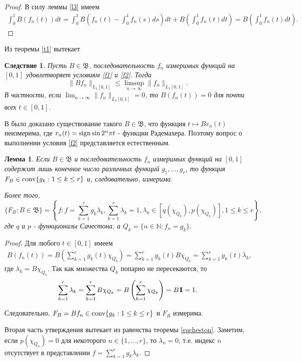 \documentclass[12pt]{article}
\newcommand{\emm}{\mathrm{1\hspace{-0.3em} I}}
\newtheorem{lem}[thm]{Лемма}
\newtheorem{cor}[thm]{Следствие}
\def\N{{\mathbb{N}}}
\def\B{{\mathfrak{B}}}
\begin{document}
\begin{proof}
В силу леммы \ref{l3} имеем
\begin{align*}
\int_0^1 B(f_n(t)) dt = \int_0^1 B\left(f_n(t)-\int_0^1 f_n(s) ds\right) dt +B\left(\int_0^1 f_n(t) dt\right)= B\left(\int_0^1 f_n(t) dt\right).
\end{align*}
\end{proof}

Из теоремы \ref{t1} вытекает

\begin{cor}
Пусть $B\in \B$, последовательность $f_n$  измеримых функций на $[0,1]$  удовлетворяет условиям \eqref{f1} и  \eqref{f2}.
Тогда
$$\|Bf_n \|_{L_1[0,1]}\le \limsup_{n\to\infty} \|f_n \|_{L_1[0,1]}.$$
В частности, если $\lim_{n\to\infty} \|f_n \|_{L_1[0,1]} = 0$, то $B(f_n(t))=0$ для почти всех $t\in[0,1]$.
\end{cor}

В \cite{FT} было доказано существование такого $B\in \B$, что функция $t\mapsto Br_n(t)$ неизмерима, где $r_n(t)={\rm sign} \sin 2^n\pi t$ - функции Радемахера. Поэтому вопрос о выполнении условия \eqref{f2} представляется естественным.

\begin{lem}\label{l5}
Если $B\in \B$ и последовательность $f_n$  измеримых функций на $[0,1]$ содержит лишь конечное число различных функций $g_1, ..., g_r$, то функция $F_B\in {\rm conv} \{g_k : 1\le k \le r\}$ и, следовательно, измерима.

Более того,
$$\{F_B: B\in \B\}= \left\{f : f=\sum_{k=1}^r g_k\lambda_k, \sum_{k=1}^r \lambda_k=1, \lambda_k \in [q(\chi_{Q_k}), p(\chi_{Q_k})],  1\le k \le r\right\},$$
где $q$ и $p$  - функционалы Сачестона, а $Q_k =\{n\in\N : f_n=g_k\}.$
\end{lem}

\begin{proof}
Для любого $t\in[0,1]$ имеем
\begin{align*}
B(f_n(t))= B\left(\sum_{k=1}^r g_k(t) \chi_{Q_k}\right)= \sum_{k=1}^r g_k(t) B\chi_{Q_k}= \sum_{k=1}^r g_k(t) \lambda_k,
\end{align*}
где $\lambda_k=B\chi_{Q_k}.$ Так как множества $Q_k$ попарно не пересекаются, то
\begin{align*}
\sum_{k=1}^r \lambda_k= \sum_{k=1}^r B\chi_{Q_k}= B\left(\sum_{k=1}^r \chi_{Q_k}\right)=B\emm=1.
\end{align*}

Следовательно, $F_B=Bf_n\in {\rm conv} \{g_k : 1\le k \le r\}$ и $F_B$ измерима.

Вторая часть утверждения вытекает из равенства теоремы \ref{sucheston}. Заметим, если $p(\chi_{Q_n})=0$ для некоторого $n\in \{1, \dots, r\}$, то $\lambda_n=0$, т.е. индекс $n$ отсутствует в представлении $f=\sum_{k=1}^r g_k\lambda_k$.

\end{proof}
\end{document}
